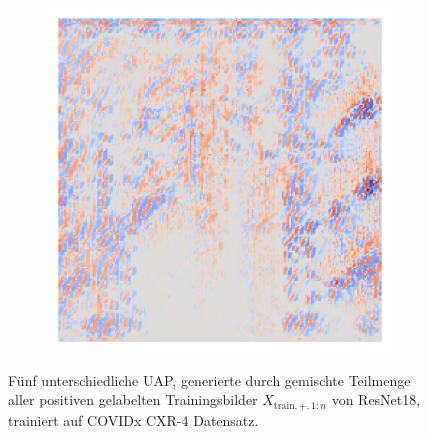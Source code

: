 \begin{figure}[H]
\begin{subfigure}{0.19\linewidth}
        \end{subfigure}\hfill%
        \begin{subfigure}{0.19\linewidth}
            \centering
            \includegraphics[height=1\linewidth]{01-images/05-resultate/uap_resnet18/uap4-resnet18-covidx_data-n200-robustificationslevel0.png}
        \end{subfigure}
    \caption{Fünf unterschiedliche UAP, generierte durch gemischte Teilmenge aller positiven gelabelten Trainingsbilder $X_{\text{train},+,1:n}$ von ResNet18, trainiert auf COVIDx CXR-4 Datensatz.}
    \label{fig:uap-resnet18-covidx-robustification-0}
\end{figure}

